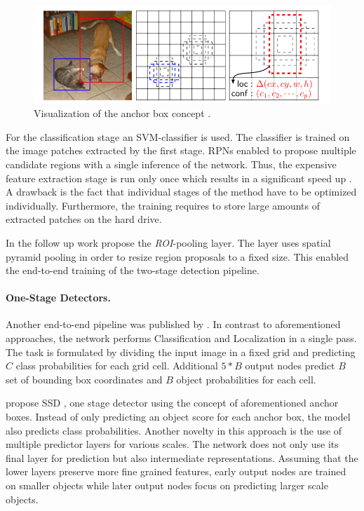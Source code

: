 \begin{figure}[hbtp]
	
	\centering
	\captionsetup{justification=raggedright,singlelinecheck=false}
	\includegraphics[width=0.8\linewidth]{fig/anchors}
	\caption{Visualization of the anchor box concept \cite{Liu}.}
	\label{fig:anchors}
	
\end{figure}

For the classification stage an \ac{SVM}-classifier is used. The classifier is trained on the image patches extracted by the first stage. \acp{RPN} enabled to propose multiple candidate regions with a single inference of the network. Thus, the expensive feature extraction stage is run only once which results in a significant speed up . A drawback is the fact that individual stages of the method have to be optimized individually. Furthermore, the training requires to store large amounts of extracted patches on the hard drive.

In the follow up work \cite{Ren} propose the \textit{ROI}-pooling layer. The layer uses spatial pyramid pooling in order to resize region proposals to a fixed size. This enabled the end-to-end training of the two-stage detection pipeline. 

\paragraph{One-Stage Detectors.}
Another end-to-end pipeline was published by \citeauthor{Redmon} \cite{Redmon}. In contrast to aforementioned approaches, the network performs Classification and Localization in a single pass. The task is formulated by dividing the input image in a fixed grid and predicting $C$ class probabilities for each grid cell. Additional $5*B$ output nodes predict $B$ set of bounding box coordinates and $B$ object probabilities for each cell. 

\citeauthor{Liu} propose \ac{SSD} \cite{Liu}, one stage detector using the concept of aforementioned anchor boxes. Instead of only predicting an object score for each anchor box, the model also predicts class probabilities. Another novelty in this approach is the use of multiple predictor layers for various scales. The network does not only use its final layer for prediction but also intermediate representations. Assuming that the lower layers preserve more fine grained features, early output nodes are trained on smaller objects while later output nodes focus on predicting larger scale objects.

